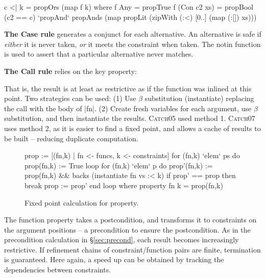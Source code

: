 \documentclass[preprint]{sigplanconf}
\newcommand{\C}[1]{\textsf{#1}}
\newcommand{\catch}{\textsc{Catch}}
\newcommand{\newtool}{\catch07}
\newcommand{\oldtool}{\catch05}
\newcommand{\para}[1]{\vspace{2mm}\noindent\textbf{#1}}
\newcommand{\ignore}{}
\begin{document}
\begin{code}
c <| k = propOrs (map f k)
    where
    f Any = propTrue
    f (Con c2 xs) = propBool (c2 == c) `propAnd`
        propAnds (map propLit (zipWith (:<) [0..] (map (:[]) xs)))
\end{code}

\para{The \C{Case} rule} generates a conjunct for each alternative. An alternative is safe if \textit{either} it is never taken, \textit{or} it meets the constraint when taken. The \C{notin} function is used to assert that a particular alternative never matches.

\para{The \C{Call} rule} relies on the key property:


That is, the result is at least as restrictive as if the function was inlined at this point. Two strategies can be used: (1) Use $\beta$ substitution (\C{instantiate}) replacing the call with the body of |fn|. (2) Create fresh variables for each argument, use $\beta$ substitution, and then instantiate the results. \oldtool{} used method 1. \newtool{} uses method 2, as it is easier to find a fixed point, and allows a cache of results to be built -- reducing duplicate computation.

\begin{figure}
\ignore\begin{code}
prop := [(fn,k) | fn <- funcs, k <- constraints]
for (fn,k) `elem` ps do prop(fn,k) := True
loop
    for (fn,k) `elem` p do
        prop'(fn,k) := prop(fn,k) && backs (instantiate fn vs :< k)
    if prop' == prop then break
    prop := prop'
end loop
    where
        property fn k = prop(fn,k)
\end{code}
\caption{Fixed point calculation for \C{property}.}
\label{fig:property_fixp}
\end{figure}

The function \C{property} takes a postcondition, and transforms it to constraints on the argument positions -- a precondition to ensure the postcondition. As in the precondition calculation in \S\ref{sec:precond}, each result becomes increasingly restrictive. If refinement chains of constraint/function pairs are finite, termination is guaranteed. Here again, a speed up can be obtained by tracking the dependencies between constraints.
\end{document}
